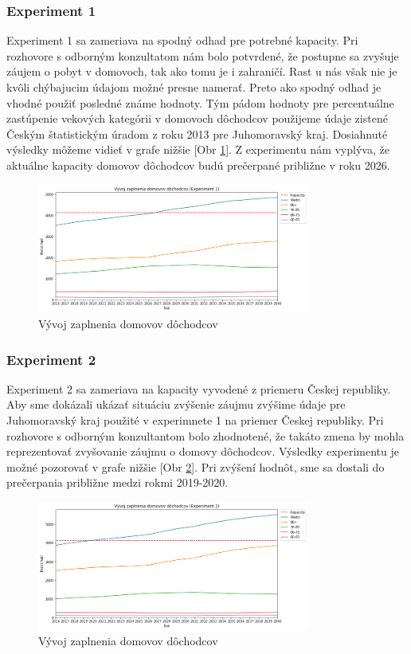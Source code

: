 \documentclass[a4paper, 11pt]{article}
\begin{document}
\subsubsection{Experiment 1}
Experiment 1 sa zameriava na spodný odhad pre potrebné kapacity. Pri rozhovore s odborným konzultatom nám bolo potvrdené, že postupne sa zvyšuje záujem o pobyt v domovoch, tak ako tomu je i zahraničí. Rast u nás však nie je kvôli chýbajucim údajom možné presne namerať. Preto ako spodný odhad je vhodné použiť posledné známe hodnoty. Tým pádom hodnoty pre percentuálne zastúpenie vekových kategórii v domovoch dôchodcov použijeme údaje zistené Českým štatistickým úradom z roku 2013 \cite{domovy2013} pre Juhomoravský kraj. Dosiahnuté výsledky môžeme vidieť v grafe nižšie [Obr \ref{exp_4}]. Z experimentu nám vyplýva, že aktuálne kapacity domovov dôchodcov budú prečerpané približne v roku 2026. 
\begin{figure}[H]
\centering
\includegraphics[width=0.8\textwidth]{exp_4}
\caption{Vývoj zaplnenia domovov dôchodcov\label{exp_4}}
\end{figure}

\subsubsection{Experiment 2}
Experiment 2 sa zameriava na kapacity vyvodené z priemeru Českej republiky. Aby sme dokázali ukázať situáciu zvýšenie záujmu zvýšime údaje pre Juhomoravský kraj použité v experimnete 1 na priemer Českej republiky. Pri rozhovore s odborným konzultantom bolo zhodnotené, že takáto zmena by mohla reprezentovať zvyšovanie záujmu o domovy dôchodcov. Výsledky experimentu je možné pozorovať v grafe nižšie [Obr \ref{exp_5}]. Pri zvýšení hodnôt, sme sa dostali do prečerpania približne medzi rokmi 2019-2020.
\begin{figure}[H]
\centering
\includegraphics[width=0.8\textwidth]{exp_5}
\caption{Vývoj zaplnenia domovov dôchodcov\label{exp_5}}
\end{figure}
\end{document}
